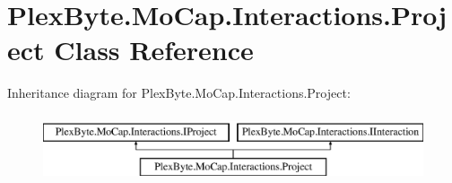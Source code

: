 \hypertarget{class_plex_byte_1_1_mo_cap_1_1_interactions_1_1_project}{}\section{Plex\+Byte.\+Mo\+Cap.\+Interactions.\+Project Class Reference}
\label{class_plex_byte_1_1_mo_cap_1_1_interactions_1_1_project}
Inheritance diagram for Plex\+Byte.\+Mo\+Cap.\+Interactions.\+Project\+:\begin{figure}[H]
\begin{center}
\leavevmode
\includegraphics[height=2.000000cm]{class_plex_byte_1_1_mo_cap_1_1_interactions_1_1_project}
\end{center}
\end{figure}
